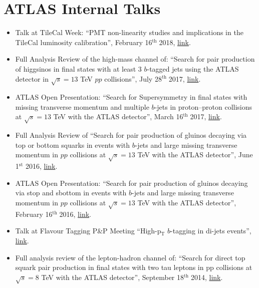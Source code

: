 \documentclass[11pt,a4paper]{moderncv}
\newcommand{\dayth}{$^\mathrm{th}\;$}
\begin{document}
\section{ATLAS Internal Talks}
\begin{itemize}
\item Talk at TileCal Week: ``PMT non-linearity studies and implications in the TileCal luminosity calibration'', February 16\dayth 2018, \href{https://indico.cern.ch/event/703027/contributions/2894678/attachments/1601891/2539936/chiara_pmt.pdf}{\color{color1}link}.
\item Full Analysis Review of the high-mass channel of: ``Search for pair production of higgsinos in final states with at least 3 $b$-tagged jets using the ATLAS detector in $\sqrt{s} = 13$ TeV $pp$ collisions'', July 28\dayth 2017, \href{https://indico.cern.ch/event/656418/contributions/2674288/attachments/1500826/2337270/FAR_hh4b_v2.pdf}{\color{color1}link}.
\item ATLAS Open Presentation: ``Search for Supersymmetry in final states with missing transverse momentum and multiple $b$-jets in proton--proton collisions at $\sqrt{s} = 13$ TeV with the ATLAS detector'', March 16\dayth 2017, \href{https://indico.cern.ch/event/622781/contributions/2512064/attachments/1429263/2194530/open_presentation.pdf}{\color{color1}link}.
\item Full Analysis Review of ``Search for pair production of gluinos decaying via top or bottom squarks in events with $b$-jets and large missing transverse momentum in $pp$ collisions at $\sqrt{s}=13$ TeV with the ATLAS detector'', June 1$^{\mathrm{st}}$ 2016, \href{https://indico.cern.ch/event/532982/contributions/2188946/attachments/1282936/1906831/FAR_Multib_chiara.pdf}{\color{color1}link}.
\item ATLAS Open Presentation: ``Search for pair production of gluinos decaying via stop and sbottom in events with $b$-jets and large missing transverse momentum in $pp$ collisions at $\sqrt{s} = 13$ TeV with the ATLAS detector'', February 16\dayth 2016, \href{https://indico.cern.ch/event/496698/contributions/1175271/attachments/1229520/1801685/open_presentation.pdf}{\color{color1}link}.
\item Talk at Flavour Tagging P\&P Meeting ``High-p$_\mathrm{T}$ $b$-tagging in di-jets events'', \href{https://indico.cern.ch/event/437597/contributions/1924966/attachments/1150999/1652290/Sept8.pdf}{\color{color1}link}.
\item Full analysis review of the lepton-hadron channel of: ``Search for direct top squark pair production in final states with two tau leptons in pp collisions at $\sqrt{s}=8$  TeV with the ATLAS detector'', September 18\dayth 2014, \href{https://indico.cern.ch/event/278649/contributions/1624956/attachments/509623/703359/FAR_Sept18.pdf}{\color{color1}link}.
\end{itemize}
\end{document}
